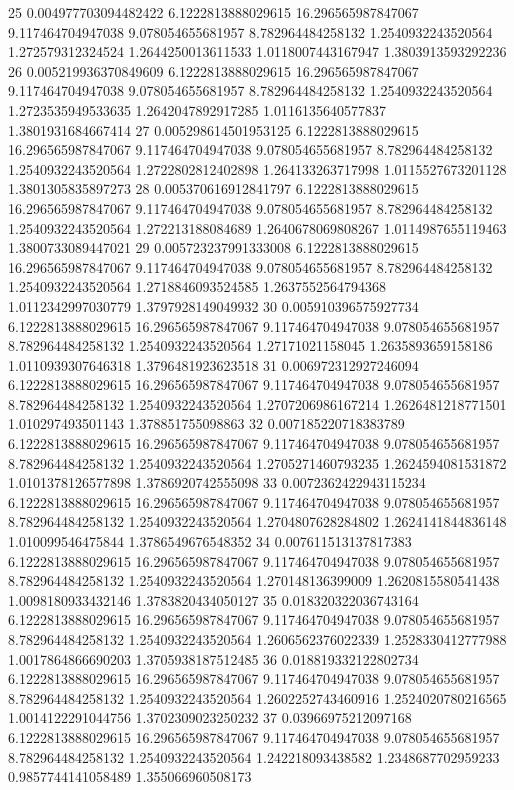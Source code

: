 {25 0.004977703094482422 6.1222813888029615 16.296565987847067 9.117464704947038 9.078054655681957 8.782964484258132 1.2540932243520564 1.272579312324524 1.2644250013611533 1.0118007443167947 1.3803913593292236
26 0.005219936370849609 6.1222813888029615 16.296565987847067 9.117464704947038 9.078054655681957 8.782964484258132 1.2540932243520564 1.2723535949533635 1.2642047892917285 1.0116135640577837 1.3801931684667414
27 0.005298614501953125 6.1222813888029615 16.296565987847067 9.117464704947038 9.078054655681957 8.782964484258132 1.2540932243520564 1.2722802812402898 1.264133263717998 1.0115527673201128 1.3801305835897273
28 0.005370616912841797 6.1222813888029615 16.296565987847067 9.117464704947038 9.078054655681957 8.782964484258132 1.2540932243520564 1.272213188084689 1.2640678069808267 1.0114987655119463 1.3800733089447021
29 0.005723237991333008 6.1222813888029615 16.296565987847067 9.117464704947038 9.078054655681957 8.782964484258132 1.2540932243520564 1.2718846093524585 1.2637552564794368 1.0112342997030779 1.3797928149049932
30 0.005910396575927734 6.1222813888029615 16.296565987847067 9.117464704947038 9.078054655681957 8.782964484258132 1.2540932243520564 1.27171021158045 1.2635893659158186 1.0110939307646318 1.3796481923623518
31 0.006972312927246094 6.1222813888029615 16.296565987847067 9.117464704947038 9.078054655681957 8.782964484258132 1.2540932243520564 1.2707206986167214 1.2626481218771501 1.010297493501143 1.378851755098863
32 0.007185220718383789 6.1222813888029615 16.296565987847067 9.117464704947038 9.078054655681957 8.782964484258132 1.2540932243520564 1.2705271460793235 1.2624594081531872 1.0101378126577898 1.3786920742555098
33 0.0072362422943115234 6.1222813888029615 16.296565987847067 9.117464704947038 9.078054655681957 8.782964484258132 1.2540932243520564 1.2704807628284802 1.2624141844836148 1.010099546475844 1.3786549676548352
34 0.007611513137817383 6.1222813888029615 16.296565987847067 9.117464704947038 9.078054655681957 8.782964484258132 1.2540932243520564 1.270148136399009 1.2620815580541438 1.0098180933432146 1.3783820434050127
35 0.018320322036743164 6.1222813888029615 16.296565987847067 9.117464704947038 9.078054655681957 8.782964484258132 1.2540932243520564 1.2606562376022339 1.2528330412777988 1.0017864866690203 1.3705938187512485
36 0.018819332122802734 6.1222813888029615 16.296565987847067 9.117464704947038 9.078054655681957 8.782964484258132 1.2540932243520564 1.2602252743460916 1.2524020780216565 1.0014122291044756 1.3702309023250232
37 0.03966975212097168 6.1222813888029615 16.296565987847067 9.117464704947038 9.078054655681957 8.782964484258132 1.2540932243520564 1.242218093438582 1.2348687702959233 0.9857744141058489 1.355066960508173
}
